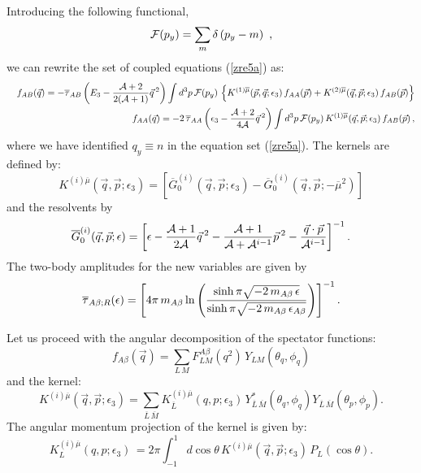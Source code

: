 \documentclass[twocolumn,showpacs,aps,prl,10pt]{revtex4}
\begin{document}
Introducing the following functional, 
\begin{equation}
{\cal F}(p_y)=\sum_{m}\delta\left(p_y-m\right) \ , 
\label{func}
\end{equation}
we can rewrite the set of coupled equations (\ref{zre5a}) as:
\begin{eqnarray}
\nonumber
&&f_{AB}(\vec q) =-\overline\tau_{AB}\left(E_3-\frac{{\cal A}+2}{2({\cal A}+1)} {\vec q}\,^2\right)
\int d^3p \, {\cal F}(p_y)\,
\left\{ K^{(1)\overline\mu}(\vec p,\vec q;\epsilon_3)\, f_{AA}(\vec p)
+  K^{(2)\overline\mu}(\vec q,\vec p;\epsilon_3)
 \,f_{AB}(\vec p)\right\} \\  
&&f_{AA}(\vec q) =-2\,\overline \tau_{AA}\left(\epsilon_3-\frac{{\cal A}+2}{4{\cal A}} {\vec q}\,^2\right) 
\int d^3p \, {\cal F}(p_y)\, K^{(1)\overline\mu}(\vec q,\vec p;\epsilon_3)
\,f_{AB}(\vec p)\, , 
   \label{zre5a1}
\end{eqnarray}
where we have identified $q_y\equiv n$  in the equation set (\ref{zre5a}). The kernels are defined by:
\begin{equation}
K^{(i)\overline\mu}(\vec q,\vec p;\epsilon_3)=
\left[\overline G^{(i)}_{0}(\vec q,\vec p;\epsilon_3)-\overline G^{(i)}_{0}(\vec q,\vec p;-\overline\mu^2)\right] 
\end{equation}
and the resolvents by
\begin{eqnarray}
\overline G^{(i)}_{0}(\vec q,\vec p;\epsilon)=\left[
\epsilon-\frac{{\cal A}+1}{2{\cal A}}\vec q\,^2 -\frac{{\cal A}+1}{{\cal A}+{\cal A}^{i-1}}
\vec p\, ^2-\frac{\vec q\cdot \vec p}{{\cal A}^{i-1}}
\right]^{-1}.
\end{eqnarray}
The two-body amplitudes for the new variables are given by
\begin{eqnarray}
\overline \tau_{A\beta;R}(\epsilon)=\left[
4\pi\,m_{A\beta}\ln\left({\sinh\pi\sqrt{-2\,m_{A\beta}\,\epsilon}\over\sinh\pi\sqrt{-2\,m_{A\beta}\,
\epsilon_{A\beta}}}\right)\right]^{-1}.
\end{eqnarray}

Let us proceed with the angular decomposition of the spectator functions:
\begin{equation}
f_{A\beta}(\vec q)=\sum_{L\,M}F^{A\beta}_{LM}(q^2)\,Y_{LM}(\theta_q,\phi_q)
\end{equation}
and the kernel:
\begin{equation}
K^{(i)\overline\mu}(\vec q,\vec p;\epsilon_3)=\sum_{ \overline L\,\overline M}K^{(i)\overline\mu}_{\overline L}(q, p;\epsilon_3)\,
Y^*_{\overline L \, \overline M}(\theta_q,\phi_q)
Y_{\overline L \, \overline M}(\theta_p,\phi_p).
\end{equation}
The angular momentum projection of the kernel is given by:
\begin{equation}
K^{(i)\overline\mu}_{L}(q, p;\epsilon_3)\,= 2\pi\int^{1}_{-1} d\cos\theta \, K^{(i)\overline\mu}(\vec q,\vec p;\epsilon_3)\,
P_L(\cos\theta).
\end{equation}
\end{document}
